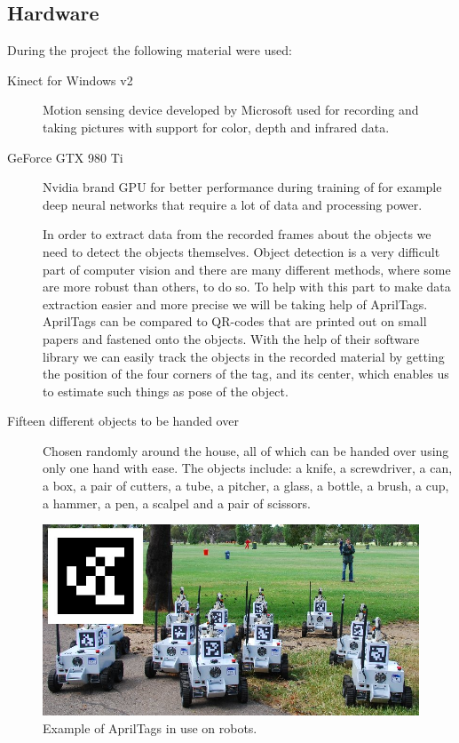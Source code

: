 \subsection*{Hardware}

During the project the following material were used:

\begin{description}
	\item[Kinect for Windows v2] Motion sensing device developed by Microsoft used for recording and taking pictures with support for color, depth and infrared data.

	\item[GeForce GTX 980 Ti] Nvidia brand GPU for better performance during training of for example deep neural networks that require a lot of data and processing power.

	\item[\textcite{AprilTags}] In order to extract data from the recorded frames about the objects we need to detect the objects themselves. Object detection is a very difficult part of computer vision and there are many different methods, where some are more robust than others, to do so. To help with this part to make data extraction easier and more precise we will be taking help of AprilTags. AprilTags can be compared to QR-codes that are printed out on small papers and fastened onto the objects. With the help of their software library we can easily track the objects in the recorded material by getting the position of the four corners of the tag, and its center, which enables us to estimate such things as pose of the object.

	\item[Fifteen different objects to be handed over] Chosen randomly around the house, all of which can be handed over using only one hand with ease. The objects include: a knife, a screwdriver, a can, a box, a pair of cutters, a tube, a pitcher, a glass, a bottle, a brush, a cup, a hammer, a pen, a scalpel and a pair of scissors.

\end{description}

\begin{figure}
	\centering
	\includegraphics[width=\textwidth]{img/methods/apriltagrobots_overlay.jpg}
	\caption{Example of AprilTags in use on robots.}
\end{figure}

